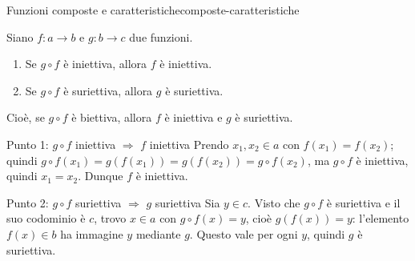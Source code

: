 \begin{concetto}
\begin{Teorema}{Funzioni composte e caratteristiche}{composte-caratteristiche}
    \begin{prerequisiti}
    \end{prerequisiti}
    Siano $f \colon a \to b$ e $g \colon b \to c$ due funzioni.
    \begin{enumerate}
        \item Se $g \circ f$ è iniettiva, allora $f$ è iniettiva.
        \item Se $g \circ f$ è suriettiva, allora $g$ è suriettiva.
    \end{enumerate}
    Cioè, se $g \circ f$ è biettiva, allora $f$ è iniettiva e $g$ è suriettiva.
\end{Teorema}
\begin{dimostrazione}
    \begin{caso}{Punto 1: $g \circ f$ iniettiva $\Rightarrow$ $f$ iniettiva}
        Prendo $x_1, x_2 \in a$ con $f(x_1) = f(x_2)$; quindi $g \circ f(x_1) = g(f(x_1)) = g(f(x_2)) = g \circ f(x_2)$,
        ma $g \circ f$ è iniettiva, quindi $x_1 = x_2$. Dunque $f$ è iniettiva.
    \end{caso}
    \begin{caso}{Punto 2: $g \circ f$ suriettiva $\Rightarrow$ $g$ suriettiva}
        Sia $y \in c$. Visto che $g \circ f$ è suriettiva e il suo codominio è $c$, trovo $x \in a$ con
        $g \circ f(x) = y$, cioè $g(f(x)) = y$: l'elemento $f(x) \in b$ ha immagine $y$ mediante $g$. Questo vale per ogni $y$,
        quindi $g$ è suriettiva.
    \end{caso}
\end{dimostrazione}
\end{concetto}

